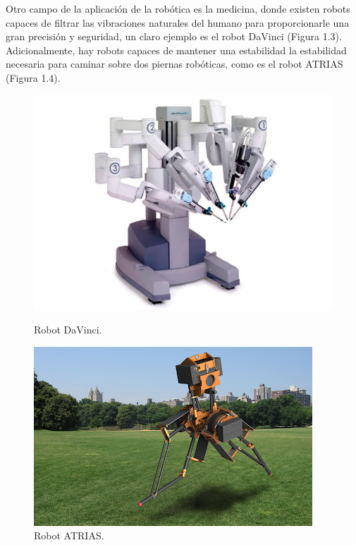 \documentclass[a4paper, 12pt]{book}
\begin{document}
Otro campo de la aplicación de la robótica es la medicina, donde existen robots capaces de filtrar las vibraciones naturales del humano para proporcionarle una gran precisión y seguridad, un claro ejemplo es el robot DaVinci (Figura 1.3). Adicionalmente, hay robots capaces de mantener una estabilidad la estabilidad necesaria para caminar sobre dos piernas robóticas, como es el robot ATRIAS (Figura 1.4).

\begin{figure}[H]
  \centering
  \begin{minipage}[b]{0.4\textwidth}
    \includegraphics[width=\textwidth]{img/davinci}
    \caption{Robot DaVinci.}
    \label{figura:robot_davinci}
  \end{minipage}
  \hfill
  \begin{minipage}[b]{0.4\textwidth}
    \includegraphics[width=\textwidth]{img/atrias}
    \caption{Robot ATRIAS.}
    \label{figura:robot_atrias}
  \end{minipage}
\end{figure}
\end{document}
